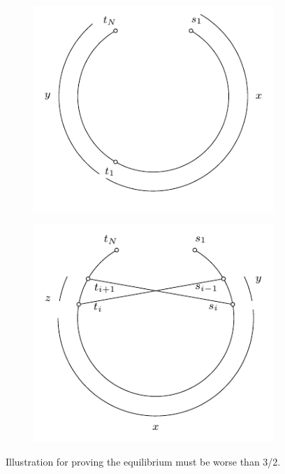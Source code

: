 \documentclass[11pt,psfig,times]{article}
\begin{document}
	\begin{figure}
		\begin{center}
			\begin{subfigure}[b]{0.3\textwidth}
				\includegraphics{pictures/lessthan3.pdf}
			\caption{}
			\end{subfigure}
			\hspace{50pt}
			\begin{subfigure}[b]{0.3\textwidth}
				\includegraphics{pictures/lessthan3_2.pdf}
				\caption{}
			\end{subfigure}
		\end{center}
		\caption{Illustration for proving the equilibrium must be worse than 3/2.}
		\label{fig:3/2equi}
	\end{figure}    
	
\end{document}
